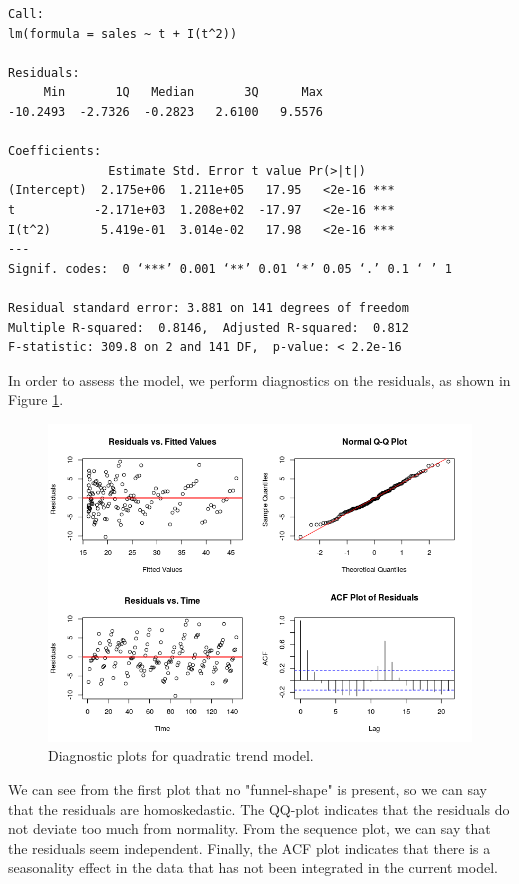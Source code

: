 \documentclass[]{article}
\begin{document}
\begin{verbatim}
Call:
lm(formula = sales ~ t + I(t^2))

Residuals:
     Min       1Q   Median       3Q      Max 
-10.2493  -2.7326  -0.2823   2.6100   9.5576 

Coefficients:
              Estimate Std. Error t value Pr(>|t|)    
(Intercept)  2.175e+06  1.211e+05   17.95   <2e-16 ***
t           -2.171e+03  1.208e+02  -17.97   <2e-16 ***
I(t^2)       5.419e-01  3.014e-02   17.98   <2e-16 ***
---
Signif. codes:  0 ‘***’ 0.001 ‘**’ 0.01 ‘*’ 0.05 ‘.’ 0.1 ‘ ’ 1

Residual standard error: 3.881 on 141 degrees of freedom
Multiple R-squared:  0.8146,  Adjusted R-squared:  0.812 
F-statistic: 309.8 on 2 and 141 DF,  p-value: < 2.2e-16
\end{verbatim}

In order to assess the model, we perform diagnostics on the residuals, as shown in Figure \ref{diag_quad}. 

\begin{figure}[!ht]
\centering
\includegraphics[width=\textwidth]{diag_quad.png}
\caption{Diagnostic plots for quadratic trend model.}
\label{diag_quad}
\end{figure}

We can see from the first plot that no "funnel-shape" is present, so we can say that the residuals are homoskedastic. The QQ-plot indicates that the residuals do not deviate too much from normality. From the sequence plot, we can say that the residuals seem independent. Finally, the ACF plot indicates that there is a seasonality effect in the data that has not been integrated in the current model.
\end{document}
